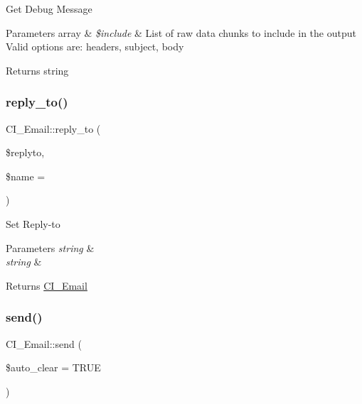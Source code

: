 Get Debug Message


\begin{DoxyParams}[1]{Parameters}
array & {\em \$include} & List of raw data chunks to include in the output Valid options are\+: \textquotesingle{}headers\textquotesingle{}, \textquotesingle{}subject\textquotesingle{}, \textquotesingle{}body\textquotesingle{} \\
\hline
\end{DoxyParams}
\begin{DoxyReturn}{Returns}
string 
\end{DoxyReturn}
\mbox{\label{class_c_i___email_af6dd3c40001406a383f56ac489d4924b}} 
\subsubsection{\texorpdfstring{reply\+\_\+to()}{reply\_to()}}
{\footnotesize\ttfamily C\+I\+\_\+\+Email\+::reply\+\_\+to (\begin{DoxyParamCaption}\item[{}]{\$replyto,  }\item[{}]{\$name = {\ttfamily \textquotesingle{}\textquotesingle{}} }\end{DoxyParamCaption})}

Set Reply-\/to


\begin{DoxyParams}{Parameters}
{\em string} & \\
\hline
{\em string} & \\
\hline
\end{DoxyParams}
\begin{DoxyReturn}{Returns}
\mbox{\hyperlink{class_c_i___email}{C\+I\+\_\+\+Email}} 
\end{DoxyReturn}
\mbox{\label{class_c_i___email_ac12eec458a55c8164beaa35e78aae730}} 
\subsubsection{\texorpdfstring{send()}{send()}}
{\footnotesize\ttfamily C\+I\+\_\+\+Email\+::send (\begin{DoxyParamCaption}\item[{}]{\$auto\+\_\+clear = {\ttfamily TRUE} }\end{DoxyParamCaption})}

